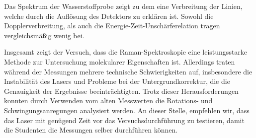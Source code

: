 \documentclass[11pt]{article}
\begin{document}
Das Spektrum der Wasserstoffprobe zeigt zu dem eine Verbreitung der Linien, welche durch die Auflösung des Detektors zu erklären ist. Sowohl die Dopplerverbreitung, als auch die Energie-Zeit-Unschärferelation tragen vergleichsmäßig wenig bei.

Insgesamt zeigt der Versuch, dass die Raman-Spektroskopie eine leistungsstarke Methode zur Untersuchung molekularer Eigenschaften ist. Allerdings traten während der Messungen mehrere technische Schwierigkeiten auf, insbesondere die Instabilität des Lasers und Probleme bei der Untergrundkorrektur, die die Genauigkeit der Ergebnisse beeinträchtigten. Trotz dieser Herausforderungen konnten durch Verwenden vom alten Messwerten die Rotations- und Schwingungsanregungen  analysiert werden. An dieser Stelle, empfehlen wir, dass das Laser mit genügend Zeit vor das Versuchsdurchführung zu testieren, damit die Studenten die Messungen selber durchführen können. 
\end{document}
